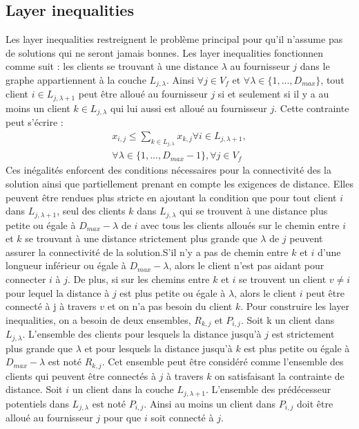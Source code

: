 \documentclass[12pt,a4paper]{article}
\begin{document}
\begin{multicols}{2}
\subsection{Layer inequalities}
Les layer inequalities restreignent le problème principal pour qu'il n'assume pas de solutions qui ne seront jamais bonnes. Les layer inequalities fonctionnen comme suit : les clients se trouvant à une distance $\lambda$ au fournisseur $j$ dans le graphe appartiennent à la couche $L_{j,\lambda}$. Ainsi $\forall j \in V_{f}$ et $\forall \lambda \in \{1,...,D_{max} \}$, tout client $i \in L_{j,\lambda + 1}$ peut être alloué au fournisseur $j$ si et seulement si il y a au moins un client $k \in L_{j,\lambda}$ qui lui aussi est alloué au fournisseur $j$. Cette contrainte peut s'écrire : 
\begin{align*}
x_{i,j} \leq \sum_{k \in L_{j,\lambda} }{x_{k,j}} \forall i \in L_{j,\lambda +1},\\ \forall \lambda \in \{ 1,...,D_{max}-1 \}, \forall j \in V_{f}
\end{align*}
Ces inégalités enforcent des conditions nécessaires pour la connectivité des la solution ainsi que partiellement prenant en compte les exigences de distance. Elles peuvent être rendues plus stricte en ajoutant la condition que pour tout client $i$ dans $L_{j,\lambda +1}$, seul des clients $k$ dans $L_{j,\lambda}$ qui se trouvent à une distance plus petite ou égale à $D_{max}-\lambda$ de $i$ avec tous les clients alloués sur le chemin entre $i$ et $k$ se trouvant à une distance strictement plus grande que $\lambda$ de $j$ peuvent assurer la connectivité de la solution.S'il n'y a pas de chemin entre $k$ et $i$ d'une longueur inférieur ou égale à $D_{max}-\lambda$, alors le client n'est pas aidant pour connecter $i$ à $j$. De plus, si sur les chemins entre $k$ et $i$ se trouvent un client $v \neq i$ pour lequel la distance à $j$ est plus petite ou égale à $\lambda$, alors le client $i$ peut être connecté à j à travers $v$ et on n'a pas besoin du client $k$.\newline \indent
Pour construire les layer inequalities, on a besoin de deux ensembles, $R_{k,j}$ et $P_{i,j}$. Soit k un client dans $L_{j,\lambda}$. L'ensemble des clients pour lesquels la distance jusqu'à $j$ est strictement plus grande que $\lambda$ et pour lesquels la distance jusqu'à $k$ est plus petite ou égale à $D_{max}-\lambda$ est noté $R_{k,j}$. Cet ensemble peut être considéré comme l'ensemble des clients qui peuvent être connectés à $j$ à travers $k$ on satisfaisant la contrainte de distance. Soit $i$ un client dans la couche $L_{j,\lambda +1}$. L'ensemble des prédécesseur potentiels dans $L_{j,\lambda}$ est noté $P_{i,j}$. Ainsi au moins un client dans $P_{i,j}$ doit être alloué au fournisseur $j$ pour que $i$ soit connecté à $j$.\newline\indent

\end{multicols}
\end{document}
